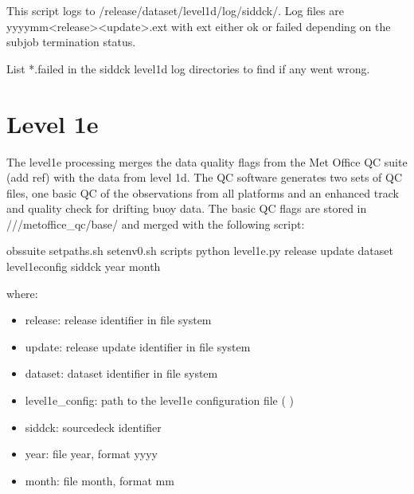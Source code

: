 \documentclass[letterpaper,10pt,english]{sphinxmanual}
\begin{document}
This script logs to /release/dataset/level1d/log/sid\sphinxhyphen{}dck/. Log files
are yyyy\sphinxhyphen{}mm\sphinxhyphen{}\textless{}release\textgreater{}\sphinxhyphen{}\textless{}update\textgreater{}.ext with ext either ok or failed depending on the
subjob termination status.

List  *.failed in the sid\sphinxhyphen{}dck level1d log directories to find if any went wrong.


\chapter{Level 1e}
\label{\detokenize{index:level-1e}}
The level1e processing merges the data quality flags from the Met Office QC
suite (add ref) with the data from level 1d. The QC software generates two sets
of QC files, one basic QC of the observations from all platforms and an enhanced
track and quality check for drifting buoy data. The basic QC flags are stored in
///metoffice\_qc/base/ and merged with the
following script:

\begin{sphinxVerbatim}[commandchars=\\\{\}]
 obs\PYGZhy{}suite
 setpaths.sh
 setenv0.sh
 scripts
python level1e.py  release update dataset level1e\PYGZus{}config sid\PYGZhy{}dck year month
\end{sphinxVerbatim}

where:
\begin{itemize}
\item {}
release: release identifier in file system

\item {}
update: release update identifier in file system

\item {}
dataset: dataset identifier in file system

\item {}
level1e\_config: path to the level1e configuration file ( {\hyperref[\detokenize{index:level1e-config-file}]{}})

\item {}
sid\sphinxhyphen{}dck: source\sphinxhyphen{}deck identifier

\item {}
year: file year, format yyyy

\item {}
month: file month, format mm

\end{itemize}
\end{document}
